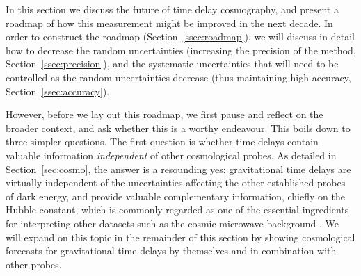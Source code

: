 In this section we discuss the future of time delay cosmography, and
present
a
roadmap of how this
measurement might be improved in the next decade. In order to construct the roadmap
(Section~\ref{ssec:roadmap}), we will discuss in detail how to
decrease the random uncertainties (increasing the precision of
the method,
Section~\ref{ssec:precision}), and the systematic uncertainties
that will
need to be controlled as the random uncertainties decrease
(thus maintaining high accuracy, Section~\ref{ssec:accuracy}).

However, before we lay out this roadmap, we first pause and
reflect on the broader context, and ask whether this is a worthy
endeavour.
%
%
%
This
boils down to three simpler questions. The first question is
whether time delays contain valuable information {\it independent} of
other cosmological probes. As detailed in Section~\ref{sec:cosmo}, the
answer is a resounding yes: gravitational time delays are virtually
independent of the uncertainties affecting the other established
probes of dark energy, and provide valuable complementary information,
chiefly on the Hubble constant, which is commonly regarded as one of
the essential ingredients for interpreting other datasets such as the
cosmic microwave background \citep{Hu05,Suy++12,Wei++13,Rie++16}.  We
will expand on this topic in the remainder of this section by showing
cosmological forecasts for gravitational time delays by themselves and
in combination with other probes.

